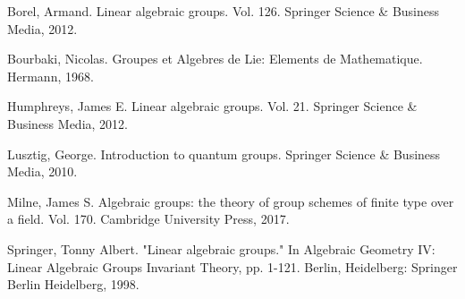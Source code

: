 \begin{thebibliography}{Yau}

 Borel, Armand. Linear algebraic groups. Vol. 126. Springer Science \& Business Media, 2012.

 Bourbaki, Nicolas. Groupes et Algebres de Lie: Elements de Mathematique. Hermann, 1968.

 Humphreys, James E. Linear algebraic groups. Vol. 21. Springer Science \& Business Media, 2012.

 Lusztig, George. Introduction to quantum groups. Springer Science \& Business Media, 2010.

 Milne, James S. Algebraic groups: the theory of group schemes of finite type over a field. Vol. 170. Cambridge University Press, 2017.


 Springer, Tonny Albert. "Linear algebraic groups." In Algebraic Geometry IV: Linear Algebraic Groups Invariant Theory, pp. 1-121. Berlin, Heidelberg: Springer Berlin Heidelberg, 1998.

\end{thebibliography}

 



